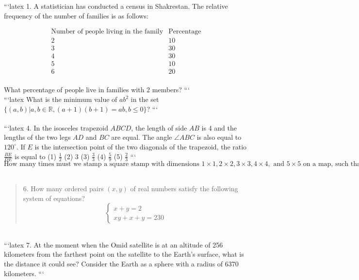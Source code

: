 ```latex
1. A statistician has conducted a census in Shakrestan. The relative frequency of the number of families is as follows:

\[
\begin{array}{c|c}
\text{Number of people living in the family} & \text{Percentage} \\
\hline
2 & 10 \\
3 & 30 \\
4 & 30 \\
5 & 10 \\
6 & 20 \\
\end{array}
\]

What percentage of people live in families with 2 members?
```
\\
```latex
What is the minimum value of $a b^2$ in the set $\{(a, b) | a, b \in \mathbb{R}, (a + 1)(b + 1) = ab, b \leq 0\}$?
```
\\
\\
```latex
4. In the isosceles trapezoid $ABCD$, the length of side $AB$ is $4$ and the lengths of the two legs $AD$ and $BC$ are equal. The angle $\angle ABC$ is also equal to $120^\circ$. If $E$ is the intersection point of the two diagonals of the trapezoid, the ratio $\frac{BE}{DE}$ is equal to 
(1) $\frac{1}{2}$ 
(2) $3$ 
(3) $\frac{3}{3}$ 
(4) $\frac{5}{9}$ 
(5) $\frac{2}{3}$ 
```
\\
\[
\text{How many times must we stamp a square stamp with dimensions } 1 \times 1, 2 \times 2, 3 \times 3, 4 \times 4, \text{ and } 5 \times 5 \text{ on a map, such that the entire map is colored, if the side of the square is one unit?}
\]
\\
\begin{quote}
6. How many ordered pairs $(x, y)$ of real numbers satisfy the following system of equations?
\[
\begin{cases} 
x + y = 2 \\ 
xy + x + y = 230 
\end{cases}
\]
\end{quote}
\\
```latex
7. At the moment when the Omid satellite is at an altitude of 256 kilometers from the farthest point on the satellite to the Earth's surface, what is the distance it could see? Consider the Earth as a sphere with a radius of 6370 kilometers.
```
\\
